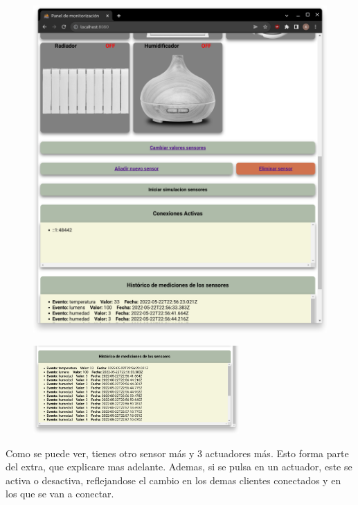 \documentclass{article}
\begin{document}
\begin{figure}[H]
\begin{minipage}[H]{0.49\textwidth}
        \includegraphics[width=\textwidth]{images/pagina2.png}
    \end{minipage}
\end{figure}

\begin{figure}[H]
    \centering
    \includegraphics[width=0.7\textwidth]{images/pagina3.png}
\end{figure}

Como se puede ver, tienes otro sensor más y 3 actuadores más. Esto forma parte del extra, que explicare mas adelante. Ademas, si se pulsa en un actuador, este se activa o desactiva, reflejandose el cambio en los demas clientes conectados y en los que se van a conectar.
\end{document}
